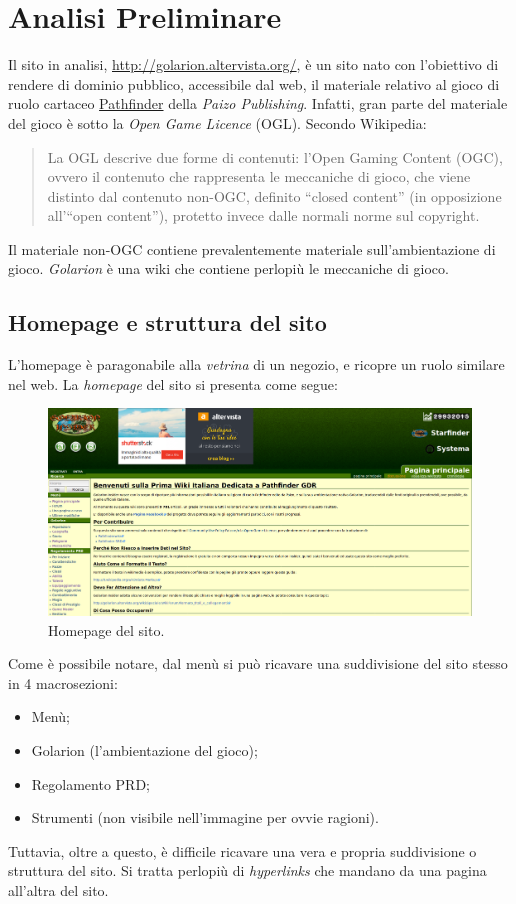 \section{Analisi Preliminare}\label{analisipre}

Il sito in analisi, \url{http://golarion.altervista.org/}, è un sito nato con l'obiettivo di
rendere di dominio pubblico, accessibile dal web, il materiale relativo al gioco di ruolo
cartaceo \href{https://it.wikipedia.org/wiki/Pathfinder_gioco_di_ruolo}{Pathfinder} della \emph{Paizo Publishing}. 
Infatti, gran parte del materiale del gioco è sotto la \emph{Open Game Licence} (OGL). Secondo Wikipedia:
\begin{quote}
    La OGL descrive due forme di contenuti: l'Open Gaming Content (OGC), ovvero il contenuto che 
    rappresenta le meccaniche di gioco, che viene distinto dal contenuto non-OGC, definito ``closed content'' 
    (in opposizione all'``open content''), protetto invece dalle normali norme sul copyright.    
\end{quote}

Il materiale non-OGC contiene prevalentemente materiale sull'ambientazione di gioco. \emph{Golarion} è una 
wiki che contiene perlopiù le meccaniche di gioco.

\subsection{Homepage e struttura del sito}
L'homepage è paragonabile alla \emph{vetrina} di un negozio, e ricopre un ruolo similare nel web.
La \emph{homepage} del sito si presenta come segue:

\begin{figure}[hbt]
    \centering
    \includegraphics[width=\textwidth]{img/home.png}
    \caption{Homepage del sito.}
\end{figure}

Come è possibile notare, dal menù si può ricavare una suddivisione del sito stesso in 4 macrosezioni:
\begin{itemize}[noitemsep]
    \item Menù;
    \item Golarion (l'ambientazione del gioco);
    \item Regolamento PRD;
    \item Strumenti (non visibile nell'immagine per ovvie ragioni).
\end{itemize}
Tuttavia, oltre a questo, è difficile ricavare una vera e propria suddivisione o struttura del sito. 
Si tratta perlopiù di \emph{hyperlinks} che mandano da una pagina all'altra del sito.

